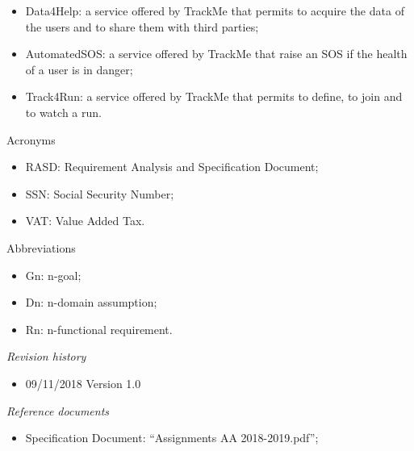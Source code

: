 \documentclass{article}
\begin{document}
\begin{legal}
\begin{legal}
\begin{legal}
{\begin{itemize}
				\item Data4Help: a service offered by TrackMe that permits to acquire the data of the users and to share them with third parties;\\
				\item AutomatedSOS: a service offered by TrackMe that raise an SOS if the health of a user is in danger;\\
				\item Track4Run: a service offered by TrackMe that permits to define, to join and to watch a run.\\
				\end{itemize}
			}	
			\item Acronyms\\
			{\normalfont	
				\begin{itemize}
				\item RASD: Requirement Analysis and Specification Document;\\
				\item SSN: Social Security Number;\\
				\item VAT: Value Added Tax.\\
				\end{itemize}
			}
			\item Abbreviations\\
			{\normalfont	
				\begin{itemize}
				\item Gn: n-goal;\\
				\item Dn: n-domain assumption;\\
				\item Rn: n-functional requirement.\\
				\end{itemize}
			}
			\end{legal}
		\item \textit{Revision history}\\
		{\normalfont
			\begin{itemize}
			\item 09/11/2018		Version 1.0\\
			\end{itemize}
		}
		\item \textit{Reference documents}\\
		{\normalfont	
			\begin{itemize}
			\item Specification Document: “Assignments AA 2018-2019.pdf”;\\

\end{itemize}}
\end{legal}
\end{legal}
\end{document}
